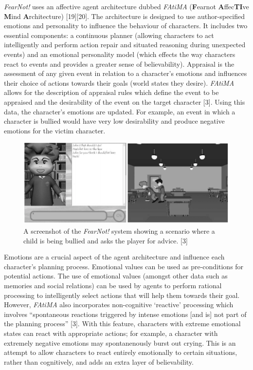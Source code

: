 \documentclass{sig-alternate-05-2015}
\begin{document}
\textit{FearNot!} uses an affective agent architecture dubbed \textit{FAtiMA} (\textbf{F}earnot \textbf{A}ffec\textbf{TI}ve \textbf{M}ind \textbf{A}rchitecture) [19][20]. The architecture is designed to use author-specified emotions and personality to influence the behaviour of characters. It includes two essential components: a continuous planner (allowing characters to act intelligently and perform action repair and situated reasoning during unexpected events) and an emotional personality model (which effects the way characters react to events and provides a greater sense of believability). Appraisal is the assessment of any given event in relation to a character's emotions and influences their choice of actions towards their goals (world states they desire). \textit{FAtiMA} allows for the description of appraisal rules which define the event to be appraised and the desirability of the event on the target character [3]. Using this data, the character's emotions are updated. For example, an event in which a character is bullied would have very low desirability and produce negative emotions for the victim character.\\

\begin{figure}
\centering
\includegraphics[scale=0.43]{Images/FearNot.png}
\caption{A screenshot of the \textit{FearNot!} system showing a scenario where a child is being bullied and asks the player for advice. [3]}
\end{figure}

Emotions are a crucial aspect of the agent architecture and influence each character's planning process. Emotional values can be used as pre-conditions for potential actions. The use of emotional values (amongst other data such as memories and social relations) can be used by agents to perform rational processing to intelligently select actions that will help them towards their goal. However, \textit{FAtiMA} also incorporates non-cognitive `reactive' processing which involves ``spontaneous reactions triggered by intense emotions [and is] not part of the planning process'' [3]. With this feature, characters with extreme emotional states can react with appropriate actions; for example, a character with extremely negative emotions may spontanenously burst out crying. This is an attempt to allow characters to react entirely emotionally to certain situations, rather than cognitively, and adds an extra layer of believability.
\end{document}
